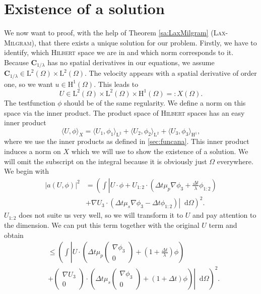 \documentclass[12pt,a4paper,twoside, open=right]{scrreprt}
\theoremstyle{definition}
\theoremstyle{plain}
\newcommand{\abs}[1]{\left\vert #1\right\vert}
\newcommand{\bfC}{\bm{C}}
\newcommand{\D}{\mathop{}\!\mathrm{d}}
\begin{document}
\section{Existence of a solution}
\label{sec:existence}
We now want to proof, with the help of Theorem \ref{sa:LaxMilgram} (\textsc{Lax-Milgram}), that there exists a unique solution for our problem. Firstly, we have to identify, which \textsc{Hilbert} space we are in and which norm corresponds to it. Because $\bfC_{1/\lambda}$ has no spatial derivatives in our equations, we assume $\bfC_{1/\lambda}\in \mathrm{L}^2(\Omega)\times \mathrm{L}^2(\Omega)$. The velocity appears with a spatial derivative of order one, so we want $u\in \mathrm{H}^1(\Omega)$. This leads to 
\begin{equation}
    U\in \mathrm{L}^2(\Omega)\times \mathrm{L}^2(\Omega)\times \mathrm{H}^1(\Omega)=:X(\Omega).
\end{equation} The testfunction $\phi$ should be of the same regularity. We define a norm on this space via the inner product. The product space of \textsc{Hilbert} spaces has an easy inner product
\begin{equation}
    \langle U,\phi\rangle_X = \langle U_1,\phi_1\rangle_{\mathrm{L}^2} +  \langle U_2,\phi_2\rangle_{\mathrm{L}^2} +\langle U_3,\phi_3\rangle_{\mathrm{H}^1},
\end{equation}
where we use the inner products as defined in \ref{sec:funcana}. This inner product induces a norm on $X$ which we will use to show the existence of a solution. We will omit the subscript on the integral because it is obviously just $\Omega$ everywhere. We begin with
\begin{align}
   \abs{a(U,\phi)}^2&=\left(\int\left\vert U\cdot\phi+U_{1:2}\cdot\left(\Delta t\mu_p\nabla\phi_3+\frac{\Delta t}{\lambda}\phi_{1:2}\right)\right.\right.\\&+\left.\left.\nabla U_3\cdot\left(\Delta t\mu_s\nabla\phi_3-\Delta t\phi_{1:2}\right)\right\vert\D\Omega\right)^2.
\end{align}
$U_{1:2}$ does not suite us very well, so we will transform it to $U$ and pay attention to the dimension. We can put this term together with the original $U$ term and obtain
\begin{align}
    &\le \left(\int\left\vert U\cdot\left(\Delta t\mu_p\begin{pmatrix}
        \nabla\phi_3\\0
        \end{pmatrix}+\left(1+\frac{\Delta t}{\lambda}\right)\phi\right)\right.\right.\\&+\left.\left.\begin{pmatrix}
       \nabla U_3\\0
        \end{pmatrix}\cdot\left(\Delta t \mu_s\begin{pmatrix}
        \nabla\phi_3\\0
        \end{pmatrix}+\left(1+\Delta t\right)\phi\right)\right\vert\D\Omega\right)^2.
\end{align}
\end{document}
